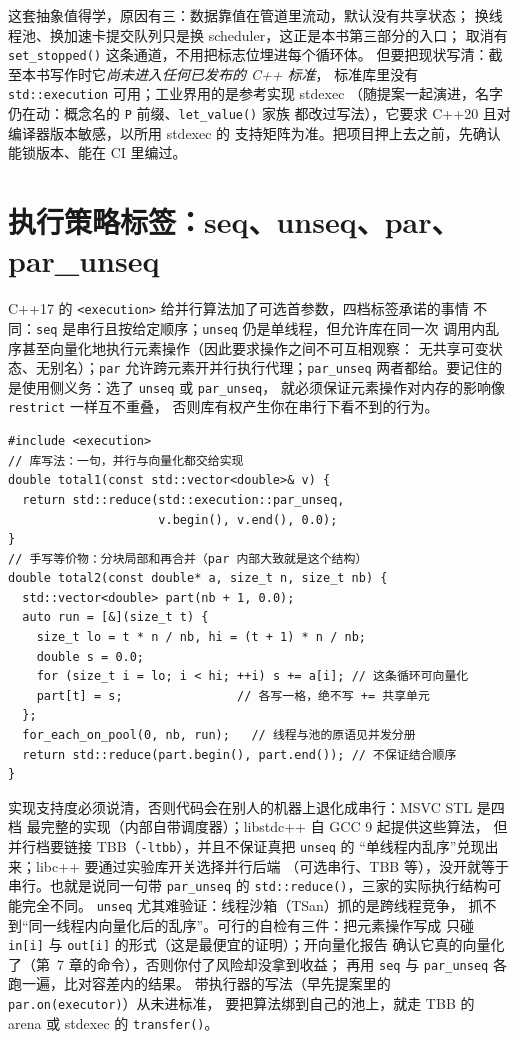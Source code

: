 \documentclass[12pt,a4paper,fontset=fandol]{ctexbook}
\newcommand{\cpp}[1]{C++#1}
\newcommand{\Fn}[1]{\texttt{#1()}}
\newcommand{\Tp}[1]{\texttt{#1}}
\begin{document}
这套抽象值得学，原因有三：数据靠值在管道里流动，默认没有共享状态；
换线程池、换加速卡提交队列只是换 scheduler，这正是本书第三部分的入口；
取消有 \Fn{set\_stopped} 这条通道，不用把标志位埋进每个循环体。
但要把现状写清：截至本书写作时它\emph{尚未进入任何已发布的 C++ 标准}，
标准库里没有 \Tp{std::execution} 可用；工业界用的是参考实现 stdexec
（随提案一起演进，名字仍在动：概念名的 \Tp{P} 前缀、\Fn{let\_value} 家族
都改过写法），它要求 \cpp{20} 且对编译器版本敏感，以所用 stdexec 的
支持矩阵为准。把项目押上去之前，先确认能锁版本、能在 CI 里编过。

\section{执行策略标签：seq、unseq、par、par\_unseq}

\cpp{17} 的 \Tp{<execution>} 给并行算法加了可选首参数，四档标签承诺的事情
不同：\Tp{seq} 是串行且按给定顺序；\Tp{unseq} 仍是单线程，但允许库在同一次
调用内乱序甚至向量化地执行元素操作（因此要求操作之间不可互相观察：
无共享可变状态、无别名）；\Tp{par} 允许跨元素开并行执行代理；\Tp{par\_unseq}
两者都给。要记住的是使用侧义务：选了 \Tp{unseq} 或 \Tp{par\_unseq}，
就必须保证元素操作对内存的影响像 \Tp{restrict} 一样互不重叠，
否则库有权产生你在串行下看不到的行为。
\begin{lstlisting}[style=cppstyle,caption={std::reduce 加 par\_unseq 与它的手写等价物}]
#include <execution>
// 库写法：一句，并行与向量化都交给实现
double total1(const std::vector<double>& v) {
  return std::reduce(std::execution::par_unseq,
                     v.begin(), v.end(), 0.0);
}
// 手写等价物：分块局部和再合并（par 内部大致就是这个结构）
double total2(const double* a, size_t n, size_t nb) {
  std::vector<double> part(nb + 1, 0.0);
  auto run = [&](size_t t) {
    size_t lo = t * n / nb, hi = (t + 1) * n / nb;
    double s = 0.0;
    for (size_t i = lo; i < hi; ++i) s += a[i]; // 这条循环可向量化
    part[t] = s;                // 各写一格，绝不写 += 共享单元
  };
  for_each_on_pool(0, nb, run);   // 线程与池的原语见并发分册
  return std::reduce(part.begin(), part.end()); // 不保证结合顺序
}
\end{lstlisting}

实现支持度必须说清，否则代码会在别人的机器上退化成串行：MSVC STL 是四档
最完整的实现（内部自带调度器）；libstdc++ 自 GCC 9 起提供这些算法，
但并行档要链接 TBB（\Tp{-ltbb}），并且不保证真把 \Tp{unseq} 的
``单线程内乱序''兑现出来；libc++ 要通过实验库开关选择并行后端
（可选串行、TBB 等），没开就等于串行。也就是说同一句带 \Tp{par\_unseq}
的 \Fn{std::reduce}，三家的实际执行结构可能完全不同。
\Tp{unseq} 尤其难验证：线程沙箱（TSan）抓的是跨线程竞争，
抓不到``同一线程内向量化后的乱序''。可行的自检有三件：把元素操作写成
只碰 \Tp{in[i]} 与 \Tp{out[i]} 的形式（这是最便宜的证明）；开向量化报告
确认它真的向量化了（第~7 章的命令），否则你付了风险却没拿到收益；
再用 \Tp{seq} 与 \Tp{par\_unseq} 各跑一遍，比对容差内的结果。
带执行器的写法（早先提案里的 \Tp{par.on(executor)}）从未进标准，
要把算法绑到自己的池上，就走 TBB 的 arena 或 stdexec 的 \Fn{transfer}。
\end{document}
